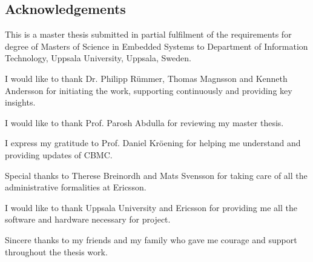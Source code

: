 \documentclass[titlepage]{book}
\begin{document}
\begin{comment}
Thesis work is done considering an Ericsson's multicore platform as case study, which uses DSP-C as programming language. \index{DSP-C}DSP-C is a set of language extensions on ISO C programming language. These extensions allow programmers to describe features of Digital Signal Processor (DSP). The work includes extending CBMC to support DSP-C, identifying Bounded Model Checking (BMC) techniques to cope-up with concurrency of Ericsson's multicore Digital Signal Processor (DSP) platform and implementing new features in CBMC to detect issues with Ericsson's parallel software. 


\end{comment}





\frontmatter

\newpage
\cleardoublepage
\begin{center}
\section{Acknowledgements}
\end{center}

This is a master thesis submitted in partial fulfilment of the requirements for degree of Masters of Science in Embedded Systems to Department of Information Technology, Uppsala University, Uppsala, Sweden.

I would like to thank Dr. Philipp R\"ummer, Thomas Magnsson and Kenneth Andersson for initiating the work, supporting continuously and providing key insights.

I would like to thank Prof. Parosh Abdulla for reviewing my master thesis.

I express my gratitude to Prof. Daniel Kr\"oening for helping me understand and providing updates of CBMC. 

Special thanks to Therese Breinordh and Mats Svensson for taking care of all the administrative formalities at Ericsson.

I would like to thank Uppsala University and Ericsson for providing me all the software and hardware necessary for project.

Sincere thanks to my friends and my family who gave me courage and support throughout the thesis work.

\end{document}
